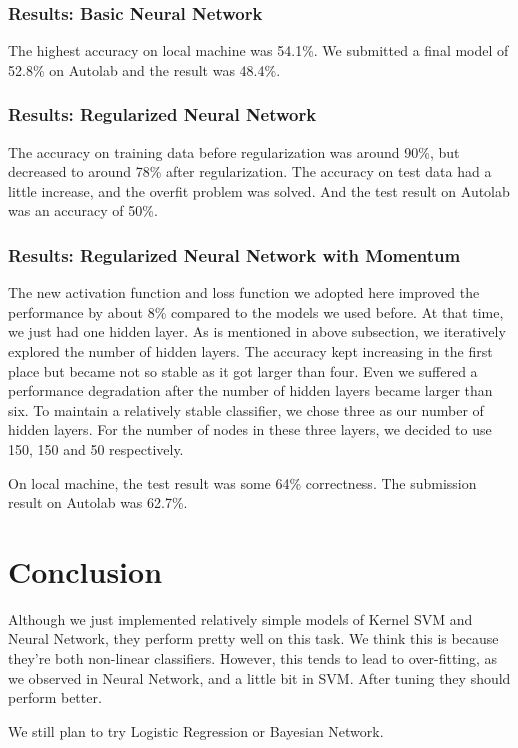 \documentclass{article} %
\begin{document}
\subsubsection{Results: Basic Neural Network}
The highest accuracy on local machine was 54.1\%. We submitted a final model of 52.8\% on Autolab and the result was 48.4\%.

\subsubsection{Results: Regularized Neural Network}
The accuracy on training data before regularization was around 90\%, but decreased to around 78\% after regularization. The accuracy on test data had a little increase, and the overfit problem was solved. And the test result on Autolab was an accuracy of 50\%.

\subsubsection{Results: Regularized Neural Network with Momentum}
The new activation function and loss function we adopted here improved the performance by about 8\% compared to the models we used before. At that time, we just had one hidden layer. As is mentioned in above subsection, we iteratively explored the number of hidden layers. The accuracy kept increasing in the first place but became not so stable as it got larger than four. Even we suffered a performance degradation after the number of hidden layers became larger than six. To maintain a relatively stable classifier, we chose three as our number of hidden layers. For the number of nodes in these three layers, we decided to use  150, 150 and 50 respectively. 

On local machine, the test result was some 64\% correctness. The submission result on Autolab was 62.7\%.

\section{Conclusion}
Although we just implemented relatively simple models of Kernel SVM and Neural Network, they perform pretty well on this task. We think this is because they're both non-linear classifiers. However, this tends to lead to over-fitting, as we observed in Neural Network, and a little bit in SVM. After tuning they should perform better.

We still plan to try Logistic Regression or Bayesian Network.




\end{document}
